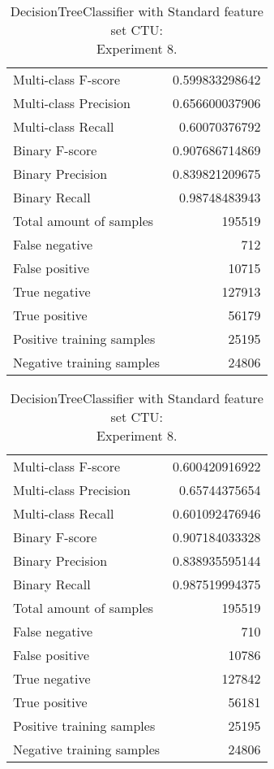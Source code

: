 \begin{table}[H]
\begin{minipage}{0.5\textwidth}
\caption{DecisionTreeClassifier with Standard feature set CTU: \\Experiment 7.}
\centering
\begin{tabular}{l r}
\toprule
Multi-class F-score & 0.599833298642 \\
Multi-class Precision & 0.656600037906 \\
Multi-class Recall & 0.60070376792 \\
\midrule
Binary F-score & 0.907686714869 \\
Binary Precision & 0.839821209675 \\
Binary Recall & 0.98748483943 \\
\midrule
Total amount of samples & 195519 \\
False negative & 712 \\
False positive & 10715 \\
True negative & 127913 \\
True positive & 56179 \\
\midrule
Positive training samples & 25195 \\
Negative training samples & 24806 \\
\bottomrule
\end{tabular}
\end{minipage}
\hfillx
\begin{minipage}{0.5\textwidth}
\caption{DecisionTreeClassifier with Standard feature set CTU: \\Experiment 8.}
\centering
\begin{tabular}{l r}
\toprule
Multi-class F-score & 0.600420916922 \\
Multi-class Precision & 0.65744375654 \\
Multi-class Recall & 0.601092476946 \\
\midrule
Binary F-score & 0.907184033328 \\
Binary Precision & 0.838935595144 \\
Binary Recall & 0.987519994375 \\
\midrule
Total amount of samples & 195519 \\
False negative & 710 \\
False positive & 10786 \\
True negative & 127842 \\
True positive & 56181 \\
\midrule
Positive training samples & 25195 \\
Negative training samples & 24806 \\
\bottomrule
\end{tabular}
\end{minipage}
\end{table}




